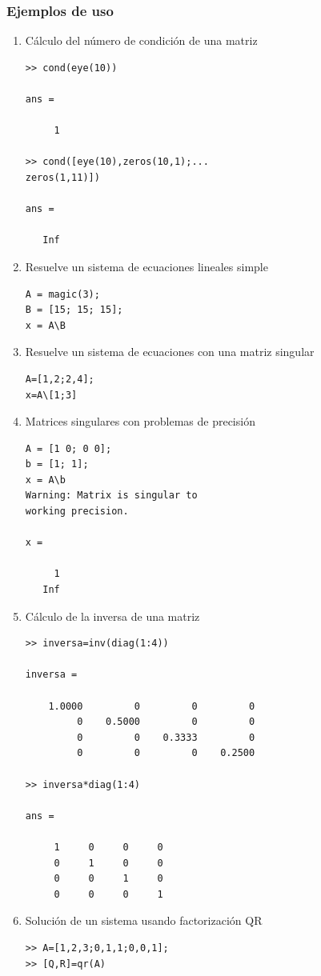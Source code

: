 \documentclass[12pt,letterpaper]{article}
\begin{document}
\subsubsection{Ejemplos de uso}
\begin{multicols}{2}
\begin{enumerate}
\item C\'alculo del n\'umero de condici\'on de una matriz
\begin{verbatim}
>> cond(eye(10))

ans =

     1

>> cond([eye(10),zeros(10,1);...
zeros(1,11)])

ans =

   Inf
\end{verbatim}
\item Resuelve un sistema de ecuaciones lineales simple
\begin{verbatim}
A = magic(3);
B = [15; 15; 15];
x = A\B
\end{verbatim}
%
\item Resuelve un sistema de ecuaciones con una matriz singular
\begin{verbatim}
A=[1,2;2,4];
x=A\[1;3]
\end{verbatim}
%
\item Matrices singulares con problemas de precisi\'on
\begin{verbatim}
A = [1 0; 0 0];
b = [1; 1];
x = A\b
Warning: Matrix is singular to 
working precision. 

x =

     1
   Inf
\end{verbatim}

\item C\'alculo de la inversa de una matriz 
\begin{verbatim}
>> inversa=inv(diag(1:4))

inversa =

    1.0000         0         0         0
         0    0.5000         0         0
         0         0    0.3333         0
         0         0         0    0.2500

>> inversa*diag(1:4)

ans =

     1     0     0     0
     0     1     0     0
     0     0     1     0
     0     0     0     1
\end{verbatim}
\item Soluci\'on de un sistema usando factorizaci\'on QR
\begin{verbatim}
>> A=[1,2,3;0,1,1;0,0,1];
>> [Q,R]=qr(A)


\end{verbatim}
\end{enumerate}
\end{multicols}
\end{document}
